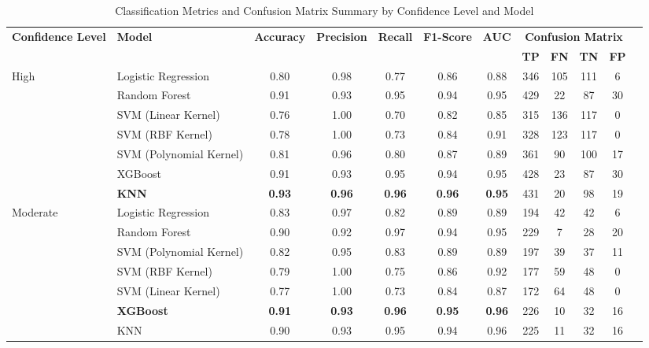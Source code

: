 \begin{table}
\centering
\caption{Classification Metrics and Confusion Matrix Summary by Confidence Level and Model}
\label{tab:confidence_metrics_cm}
\renewcommand{\arraystretch}{1.3}
\begin{tabular}{llcccccccccc}
\toprule
\textbf{Confidence Level} & \textbf{Model} & \textbf{Accuracy} & \textbf{Precision} & \textbf{Recall} & \textbf{F1-Score} & \textbf{AUC} & \multicolumn{4}{c}{\textbf{Confusion Matrix}} \\
\cmidrule(lr){8-11}
& & & & & & & \textbf{TP} & \textbf{FN} & \textbf{TN} & \textbf{FP} \\
\midrule
\multirow{7}{*}{High}
& Logistic Regression       & 0.80 & 0.98 & 0.77 & 0.86 & 0.88 & 346 & 105 & 111 & 6 \\
& Random Forest             & 0.91 & 0.93 & 0.95 & 0.94 & 0.95 & 429 & 22 & 87 & 30 \\
& SVM (Linear Kernel)       & 0.76 & 1.00 & 0.70 & 0.82 & 0.85 & 315 & 136 & 117 & 0 \\
& SVM (RBF Kernel)          & 0.78 & 1.00 & 0.73 & 0.84 & 0.91 & 328 & 123 & 117 & 0 \\
& SVM (Polynomial Kernel)   & 0.81 & 0.96 & 0.80 & 0.87 & 0.89 & 361 & 90 & 100 & 17 \\
& XGBoost                   & 0.91 & 0.93 & 0.95 & 0.94 & 0.95 & 428 & 23 & 87 & 30 \\
& \textbf{KNN}              & \textbf{0.93} & \textbf{0.96} & \textbf{0.96} & \textbf{0.96} & \textbf{0.95} & 431 & 20 & 98 & 19 \\

\midrule
\multirow{7}{*}{Moderate}
& Logistic Regression       & 0.83 & 0.97 & 0.82 & 0.89 & 0.89 & 194 & 42 & 42 & 6 \\
& Random Forest             & 0.90 & 0.92 & 0.97 & 0.94 & 0.95 & 229 & 7 & 28 & 20 \\
& SVM (Polynomial Kernel)   & 0.82 & 0.95 & 0.83 & 0.89 & 0.89 & 197 & 39 & 37 & 11 \\
& SVM (RBF Kernel)          & 0.79 & 1.00 & 0.75 & 0.86 & 0.92 & 177 & 59 & 48 & 0 \\
& SVM (Linear Kernel)       & 0.77 & 1.00 & 0.73 & 0.84 & 0.87 & 172 & 64 & 48 & 0 \\
& \textbf{XGBoost}          & \textbf{0.91} & \textbf{0.93} & \textbf{0.96} & \textbf{0.95} & \textbf{0.96} & 226 & 10 & 32 & 16 \\
& KNN                       & 0.90 & 0.93 & 0.95 & 0.94 & 0.96 & 225 & 11 & 32 & 16 \\



\end{tabular}
\end{table}
